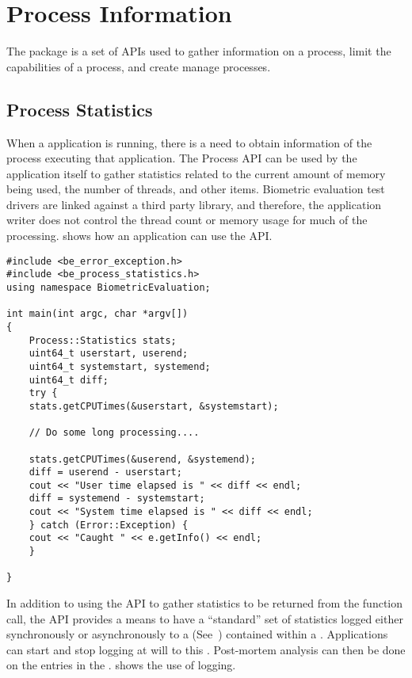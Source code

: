 %
%
\chapter{Process Information}
\label{chp-process}

The  package is a set of APIs used to gather information on a process,
limit the capabilities of a process, and create manage processes.

\section{Process Statistics}
\label{sec-process_statistics}

When a application is running, there is a need to obtain information of the
process executing that application. The Process API can be used by the
application itself to gather statistics related to the current amount of memory
being used, the number of threads, and other items. Biometric evaluation test
drivers are linked against a third party library, and therefore, the application
writer does not control the thread count or memory usage for much of the
processing.  shows how an application can
use the  API.

\begin{lstlisting}[caption={Gathering Process Statistics}, label=processstatisticsuse]
#include <be_error_exception.h>
#include <be_process_statistics.h>
using namespace BiometricEvaluation;

int main(int argc, char *argv[])
{
    Process::Statistics stats;
    uint64_t userstart, userend;
    uint64_t systemstart, systemend;
    uint64_t diff;
    try {
	stats.getCPUTimes(&userstart, &systemstart);

	// Do some long processing....

	stats.getCPUTimes(&userend, &systemend);
	diff = userend - userstart;
	cout << "User time elapsed is " << diff << endl;
	diff = systemend - systemstart;
	cout << "System time elapsed is " << diff << endl;
    } catch (Error::Exception) {
	cout << "Caught " << e.getInfo() << endl;
    }

}
\end{lstlisting}

In addition to using the  API to gather statistics to be returned from
the function call, the API provides a means to have a ``standard'' set of
statistics logged either synchronously or asynchronously to a 
 (See~) contained within a .
Applications can
start and stop logging at will to this . Post-mortem analysis can
then be done on the entries in the . 
shows the use of logging.

